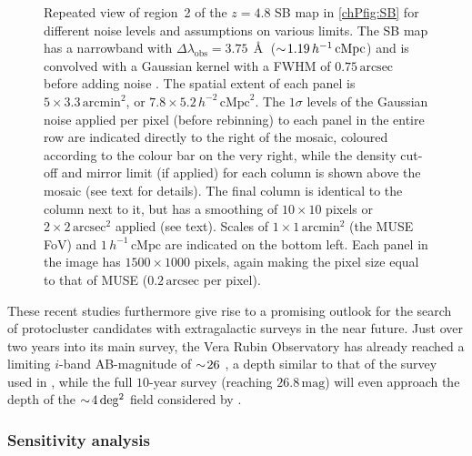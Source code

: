 \begin{figure}
    {Repeated view of region~2 of the $z=4.8$ SB map in \cref{chPfig:SB} for different noise levels and assumptions on various limits. The SB map has a narrowband with $\Delta \lambda_\text{obs} = 3.75 \, \Angstrom$ ($\sim \! 1.19 \, h^{-1} \, \mathrm{cMpc}$) and is convolved with a Gaussian kernel with a FWHM of $0.75 \, \mathrm{arcsec}$ before adding noise \citep[as in the HDFS observation, see][]{2015A&A...575A..75B}. The spatial extent of each panel is $5 \times 3.3 \, \mathrm{arcmin}^2$, or $7.8 \times 5.2 \, h^{-2} \, \mathrm{cMpc}^2$. The $1 \sigma$ levels of the Gaussian noise applied per pixel (before rebinning) to each panel in the entire row are indicated directly to the right of the mosaic, coloured according to the colour bar on the very right, while the density cut-off and mirror limit (if applied) for each column is shown above the mosaic (see text for details). The final column is identical to the column next to it, but has a smoothing of $10 \times 10$ pixels or $2 \times 2 \, \mathrm{arcsec}^2$ applied (see text). Scales of $1 \times 1 \, \mathrm{arcmin}^2$ (the MUSE FoV) and $1 \, h^{-1} \, \mathrm{cMpc}$ are indicated on the bottom left. Each panel in the image has $1500 \times 1000$ pixels, again making the pixel size equal to that of MUSE ($0.2 \, \mathrm{arcsec}$ per pixel).}
    \label{chPfig:4nsobs5}
\end{figure}

These recent studies furthermore give rise to a promising outlook for the search of protocluster candidates with extragalactic surveys in the near future. Just over two years into its main survey, the Vera Rubin Observatory has already reached a limiting $i$-band AB-magnitude of $\sim \! 26$ \citep{2019ApJ...873..111I}, a depth similar to that of the survey used in \citet{2018PASJ...70S..12T}, while the full $10$-year survey (reaching $26.8 \, \mathrm{mag}$) will even approach the depth of the $\sim \! 4 \, \mathrm{deg^2}$ field considered by \citet{2016ApJ...826..114T}.

\subsubsection{Sensitivity analysis}
\label{chPsssec:Sensitivity analysis}


